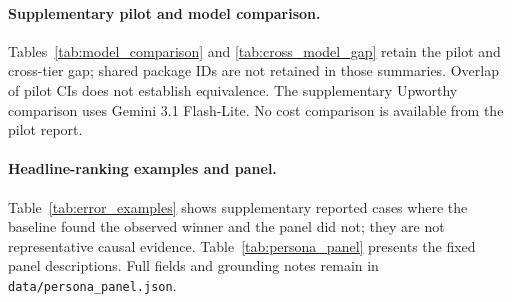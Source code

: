 \paragraph{Supplementary pilot and model comparison.}
Tables~\ref{tab:model_comparison} and \ref{tab:cross_model_gap} retain the pilot and cross-tier
gap; shared package IDs are not retained in those summaries. Overlap of pilot CIs does not establish equivalence. The supplementary Upworthy comparison uses Gemini
3.1 Flash-Lite. No cost comparison is available from the pilot report.



\paragraph{Headline-ranking examples and panel.}
Table~\ref{tab:error_examples} shows supplementary reported cases where the baseline found the observed winner
and the panel did not; they are not representative causal evidence.
Table~\ref{tab:persona_panel} presents the fixed panel descriptions. Full fields and grounding
notes remain in \texttt{data/persona\_panel.json}.



